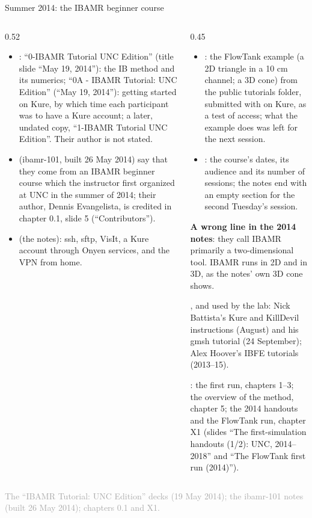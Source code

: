 \documentclass[aspectratio=169,11pt]{beamer}
\newcommand{\sourcecredit}[1]{\vfill\begin{flushright}\tiny\textcolor{DarkGray}{#1}\end{flushright}}
\begin{document}
\begin{frame}{Summer 2014: the IBAMR beginner course}
\label{fr:summer2014}
\begin{columns}[T,onlytextwidth]
\begin{column}{0.52\textwidth}
\footnotesize
\begin{itemize}\setlength{\itemsep}{3pt}
  \item {}: ``0-IBAMR Tutorial UNC Edition'' (title slide ``May 19, 2014''): the IB method and its numerics; ``0A - IBAMR Tutorial: UNC Edition'' (``May 19, 2014''): getting started on Kure, by which time each participant was to have a Kure account; a later, undated copy, ``1-IBAMR Tutorial UNC Edition''. Their author is not stated.
  \item {} (ibamr-101, built 26 May 2014) say that they come from an IBAMR beginner course which the instructor first organized at UNC in the summer of 2014; their author, Dennis Evangelista, is credited in chapter 0.1, slide 5 (``Contributors'').
  \item {} (the notes): ssh, sftp, VisIt, a Kure account through Onyen services, and the VPN from home.
\end{itemize}
\end{column}
\begin{column}{0.45\textwidth}
\scriptsize
\begin{itemize}\setlength{\itemsep}{2pt}
  \item {}: the FlowTank example (a 2D triangle in a 10 cm channel; a 3D cone) from the public tutorials folder, submitted with  on Kure, as a test of access; what the example does was left for the next session.
  \item {}: the course's dates, its audience and its number of sessions; the notes end with an empty section for the second Tuesday's session.
\end{itemize}
\begin{punchbox}
\scriptsize \textbf{A wrong line in the 2014 notes}: they call IBAMR primarily a two-dimensional tool. IBAMR runs in 2D and in 3D, as the notes' own 3D cone shows.
\end{punchbox}
, and used by the lab: Nick Battista's Kure and KillDevil instructions (August) and his gmsh tutorial (24 September); Alex Hoover's IBFE tutorials (2013--15).

\vspace{1mm}
: the first run, chapters 1--3; the overview of the method, chapter 5; the 2014 handouts and the FlowTank run, chapter X1 (slides ``The first-simulation handouts (1/2): UNC, 2014--2018'' and ``The FlowTank first run (2014)'').
\end{column}
\end{columns}
\sourcecredit{The ``IBAMR Tutorial: UNC Edition'' decks (19 May 2014); the ibamr-101 notes (built 26 May 2014); chapters 0.1 and X1.}
\end{frame}
\end{document}

